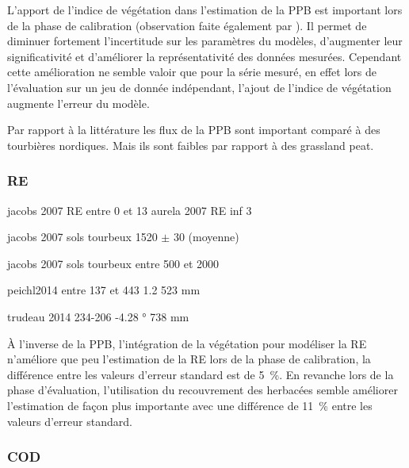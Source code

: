 L'apport de l'indice de végétation dans l'estimation de la PPB est important lors de la phase de calibration (observation faite également par \cite{bortoluzzi2006}).
Il permet de diminuer fortement l'incertitude sur les paramètres du modèles, d'augmenter leur significativité et d'améliorer la représentativité des données mesurées.
Cependant cette amélioration ne semble valoir que pour la série mesuré, en effet lors de l'évaluation sur un jeu de donnée indépendant, l'ajout de l'indice de végétation augmente l'erreur du modèle.



Par rapport à la littérature les flux de la PPB sont important comparé à des tourbières nordiques.
Mais ils sont faibles par rapport à des grassland peat.

\subsubsection{RE}

jacobs 2007 RE entre 0 et \SI{13}{\uml} 
aurela 2007 RE inf \SI{3}{\uml}

jacobs 2007  sols tourbeux 1520 $\pm$ \SI{30}{\gcma} (moyenne)

jacobs 2007  sols tourbeux entre 500 et \SI{2000}{\gcma}

peichl2014 entre 137 et \SI{443}{\gcma} 1.2 523 mm

trudeau 2014 234-\SI{206}{\gcma} -4.28 ° 738 mm

À l'inverse de la PPB, l'intégration de la végétation pour modéliser la RE n'améliore que peu l'estimation de la RE lors de la phase de calibration, la différence entre les valeurs d'erreur standard est de \SI{5}{\percent}.
En revanche lors de la phase d'évaluation, l'utilisation du recouvrement des herbacées semble améliorer l'estimation de façon plus importante avec une différence de \SI{11}{\percent} entre les valeurs d'erreur standard.



\subsubsection{\chh}



\subsubsection{COD}

